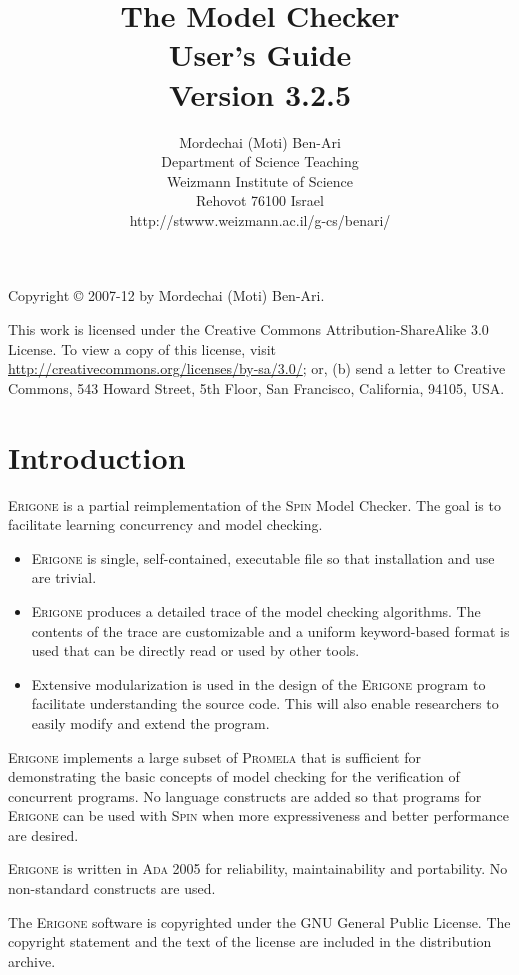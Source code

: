 \documentclass[11pt]{article}
\title{The \prg{} Model Checker\\\bigskip%
User's Guide\\\bigskip%
\large Version 3.2.5\\\bigskip}     %
\author{Mordechai (Moti) Ben-Ari\\
Department of Science Teaching\\
Weizmann Institute of Science\\
Rehovot 76100 Israel\\
\textsf{http://stwww.weizmann.ac.il/g-cs/benari/}}
\newcommand*{\prg}{\textsc{Erigone}}
\newcommand*{\spn}{\textsc{Spin}}
\newcommand*{\prm}{\textsc{Promela}}
\newcommand*{\ada}{\textsc{Ada 2005}}
\begin{document}
\maketitle
\thispagestyle{empty}

\vfill

\begin{center}
Copyright \copyright{} 2007-12 by Mordechai (Moti) Ben-Ari.
\end{center}
This work is licensed under the Creative Commons Attribution-ShareAlike 3.0
License. To view a copy of this license, visit
\url{http://creativecommons.org/licenses/by-sa/3.0/}; or, (b) send a letter
to Creative Commons, 543 Howard Street, 5th Floor, San Francisco,
California, 94105, USA.


\newpage

\section{Introduction}

\prg{} is a partial reimplementation of the \spn{} Model Checker. The goal
is to facilitate learning concurrency and model checking.
\begin{itemize}
\item \prg{} is single, self-contained, executable file so that
installation and use are trivial.
\item \prg{} produces a detailed trace of the model checking
algorithms. The contents of the trace are customizable and a uniform
keyword-based format is used that can be directly read or used by other
tools.
\item Extensive modularization is used in the design of the \prg{}
program to facilitate understanding the source code. This will also
enable researchers to easily modify and extend the program.
\end{itemize}
\prg{} implements a large subset of \prm{} that is sufficient for
demonstrating the basic concepts of model checking for the verification
of concurrent programs. No language constructs are added so that
programs for \prg{} can be used with \spn{} when more expressiveness and
better performance are desired.

\prg{} is written in \ada{} for reliability, maintainability and
portability. No non-standard constructs are used.

The \prg{} software is copyrighted under the \textsc{GNU} General Public
License. The copyright statement and the text of the license are
included in the distribution archive.
\end{document}
